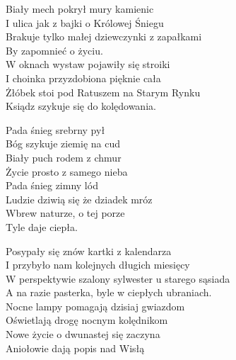 \begin{text}
    Biały mech pokrył mury kamienic\\
    I ulica jak z bajki o Królowej Śniegu\\
    Brakuje tylko małej dziewczynki z zapałkami\\
    By zapomnieć o życiu.\\
    W oknach wystaw pojawiły się stroiki\\
    I choinka przyzdobiona pięknie cała\\
    Żłóbek stoi pod Ratuszem na Starym Rynku\\
    Ksiądz szykuje się do kolędowania.

    \vin Pada śnieg srebrny pył\\
    \vin Bóg szykuje ziemię na cud\\
    \vin Biały puch rodem z chmur\\
    \vin Życie prosto z samego nieba\\
    \vin Pada śnieg zimny lód\\
    \vin Ludzie dziwią się że dziadek mróz\\
    \vin Wbrew naturze, o tej porze\\
    \vin Tyle daje ciepła.

    Posypały się znów kartki z kalendarza\\
    I przybyło nam kolejnych długich miesięcy\\
    W perspektywie szalony sylwester u starego sąsiada\\
    A na razie pasterka, byle w ciepłych ubraniach.\\
    Nocne lampy pomagają dzisiaj gwiazdom\\
    Oświetlają drogę nocnym kolędnikom\\
    Nowe życie o dwunastej się zaczyna\\
    Aniołowie dają popis nad Wisłą
\end{text}
